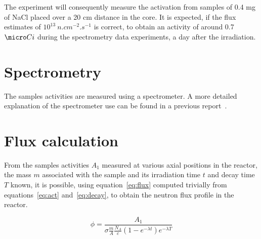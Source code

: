 The experiment will consequently measure the activation from samples of 0.4 mg of NaCl placed over a 20 cm distance in the core. It is expected, if the flux estimates of $10^{13}\ n.cm^{-2}.s^{-1}$ is correct, to obtain an activity of around 0.7 $\micro Ci$ during the spectrometry data experiments, a day after the irradiation.

\section{Spectrometry}
The samples activities are measured using a spectrometer. A more detailed explanation of the spectrometer use can be found in a previous report~\cite{glher01}.


\section{Flux calculation}

From the samples activities $A_1$ measured at various axial positions in the reactor, the mass $m$ associated with the sample and its irradiation time $t$ and decay time $T$ known, it is possible, using equation~\ref{eq:flux} computed trivially from equations~\ref{eq:act} and~\ref{eq:decay}, to obtain the neutron flux profile in the reactor.

\begin{equation}
\phi = \frac{A_1}{\sigma \frac{m}{A} \frac{N_A}{c} (1-e^{-\lambda t}) e^{-\lambda T}}
\label{eq:flux}
\end{equation}
